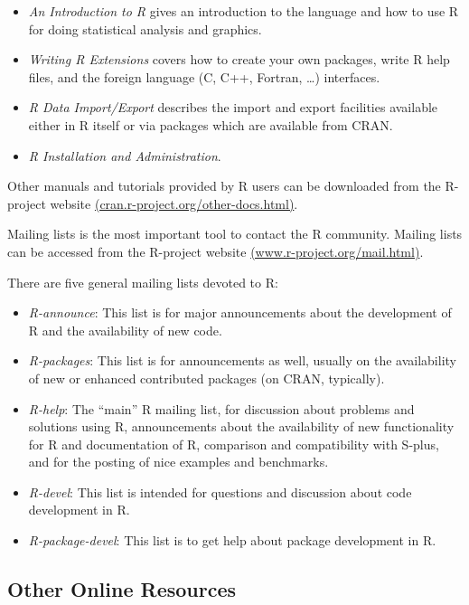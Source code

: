 \documentclass[]{book}
\providecommand{\tightlist}{%
  \setlength{\itemsep}{0pt}\setlength{\parskip}{0pt}}
\def\tightlist{}
\begin{document}
\begin{itemize}
\tightlist
\item
  \emph{An Introduction to R} gives an introduction to the language and
  how to use R for doing statistical analysis and graphics.
\item
  \emph{Writing R Extensions} covers how to create your own packages,
  write R help files, and the foreign language (C, C++, Fortran,
  \ldots{}) interfaces.
\item
  \emph{R Data Import/Export} describes the import and export facilities
  available either in R itself or via packages which are available from
  CRAN.
\item
  \emph{R Installation and Administration}.
\end{itemize}

Other manuals and tutorials provided by R users can be downloaded from
the R-project website
\href{http://cran.r-project.org/other-docs.html}{(cran.r-project.org/other-docs.html)}.

Mailing lists is the most important tool to contact the R community.
Mailing lists can be accessed from the R-project website
\href{http://www.r-project.org/mail.html}{(www.r-project.org/mail.html)}.

There are five general mailing lists devoted to R:

\begin{itemize}
\tightlist
\item
  \emph{R-announce}: This list is for major announcements about the
  development of R and the availability of new code.
\item
  \emph{R-packages}: This list is for announcements as well, usually on
  the availability of new or enhanced contributed packages (on CRAN,
  typically).
\item
  \emph{R-help}: The ``main'' R mailing list, for discussion about
  problems and solutions using R, announcements about the availability
  of new functionality for R and documentation of R, comparison and
  compatibility with S-plus, and for the posting of nice examples and
  benchmarks.
\item
  \emph{R-devel}: This list is intended for questions and discussion
  about code development in R.
\item
  \emph{R-package-devel}: This list is to get help about package
  development in R.
\end{itemize}

\subsection{Other Online Resources}\label{other-online-resources}
\end{document}
